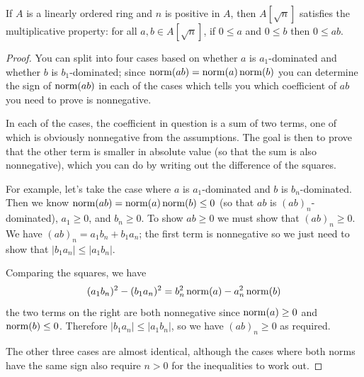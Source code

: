 \begin{lemma}[Multiplicativity]
  \label{thm:multiplicativity}
  \leanok
  If $A$ is a linearly ordered ring and $n$ is positive in $A$, then
  $A[\sqrt{n}]$ satisfies the multiplicative property: for all $a, b ∈
  A[\sqrt{n}]$, if $0 \leq a$ and $0 \leq b$ then $0 \leq ab$.
\end{lemma}
\begin{proof}
  \leanok
  You can split into four cases based on whether $a$ is $a_1$-dominated and
  whether $b$ is $b_1$-dominated; since $\operatorname{norm}(ab) = \operatorname{norm}(a)\operatorname{norm}(b)$ you can
  determine the sign of $\operatorname{norm}(ab)$ in each of the cases which tells you which
  coefficient of $ab$ you need to prove is nonnegative.

  In each of the cases, the coefficient in question is a sum of two terms, one
  of which is obviously nonnegative from the assumptions. The goal is then to
  prove that the other term is smaller in absolute value (so that the sum is
  also nonnegative), which you can do by writing out the difference of the squares.

  For example, let's take the case where $a$ is $a_1$-dominated and $b$ is
  $b_n$-dominated. Then we know $\operatorname{norm}(ab) = \operatorname{norm}(a)\operatorname{norm}(b) \leq 0$ (so that
  $ab$ is $(ab)_n$-dominated), $a_1 \geq 0$, and $b_n \geq 0$. To show $ab \geq
  0$ we must show that $(ab)_n \geq 0$. We have $(ab)_n = a_1b_n + b_1a_n$; the
  first term is nonnegative so we just need to show that $|b_1a_n| \leq |a_1b_n|$.

  Comparing the squares, we have
  \begin{displaymath}
    (a_1b_n)^2 - (b_1a_n)^2 = b_n^2\operatorname{norm}(a) - a_n^2\operatorname{norm}(b)
  \end{displaymath}
  the two terms on the right are both nonnegative since $\operatorname{norm}(a) \geq 0$ and
  $\operatorname{norm}(b) \leq 0$. Therefore $|b_1a_n| \leq |a_1b_n|$, so we have $(ab)_n
  \geq 0$ as required.

  The other three cases are almost identical, although the cases where both
  norms have the same sign also require $n > 0$ for the inequalities to work out.
\end{proof}

